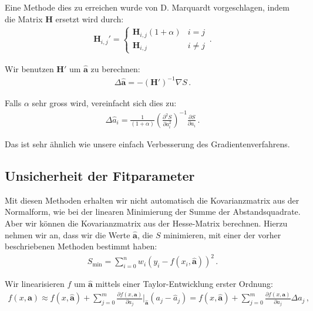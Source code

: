 Eine Methode dies zu erreichen wurde von D. Marquardt vorgeschlagen, indem die Matrix $\boldsymbol{H}$ ersetzt wird durch:
\begin{align}
\boldsymbol{H}_{i,j}' =
    \begin{cases}
        \boldsymbol{H}_{i,j} (1 + \alpha) &i = j \\
        \boldsymbol{H}_{i,j} &i \neq j 
    \end{cases}\,.       
\label{eq:vl9-16}
\end{align}

Wir benutzen $\boldsymbol{H}'$ um $\boldsymbol{\hat{a}}$ zu berechnen:
\begin{align}
\Delta \boldsymbol{\hat{a}} = - (\boldsymbol{H}')^{-1} \nabla S\,.
\label{eq:vl9-17}
\end{align}

Falls $\alpha$ sehr gross wird, vereinfacht sich dies zu:
\begin{align}
\Delta \hat{a}_i = \frac{1}{ (1 + \alpha) } \left( \frac{ \partial^2 S }{ \partial a_i^2 } \right)^{-1} \frac{ \partial S }{ \partial a_i } \,.
\label{eq:vl9-18}
\end{align}

Das ist sehr \"ahnlich wie unsere einfach Verbesserung des Gradientenverfahrens.


\subsection{Unsicherheit der Fitparameter}
\label{subsec:vl9-2}

Mit diesen Methoden erhalten wir nicht automatisch die Kovarianzmatrix aus der Normalform, wie bei der linearen Minimierung der Summe der Abstandsquadrate. Aber wir k\"onnen die Kovarianzmatrix aus der Hesse-Matrix berechnen. Hierzu nehmen wir an, dass wir die Werte $\boldsymbol{\hat{a}}$, die $S$ minimieren, mit einer der vorher beschriebenen Methoden bestimmt haben:
\begin{align}
S_\text{min} = \sum_{i=0}^n w_i (y_i - f (x_i, \boldsymbol{\hat{a}}))^2\,.
\label{eq:vl9-19}
\end{align}

Wir linearisieren $f$ um $\boldsymbol{\hat{a}}$ mittels einer Taylor-Entwicklung erster Ordnung:
\begin{align}
f(x, \boldsymbol{a}) \approx f(x, \boldsymbol{\hat{a}}) + \sum_{j=0}^m \frac{ \partial f (x, \boldsymbol{a}) }{ \partial a_j } \bigg|_{\boldsymbol{\hat{a}}} (a_j - \hat{a}_j) = f(x, \boldsymbol{\hat{a}}) + \sum_{j=0}^m \frac{ \partial f(x, \boldsymbol{a}) }{ \partial a_j } \Delta a_j\,,
\label{eq:vl9-20}
\end{align}


